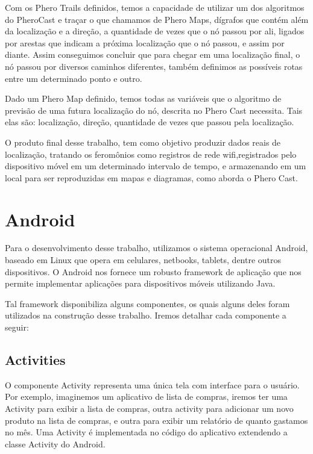\documentclass[12pt, %
openright, 
oneside,
a4paper,
brazil]{facom-ufu-abntex2}
\begin{document}
	Com os Phero Trails definidos, temos a capacidade de utilizar um dos algoritmos do PheroCast e traçar o que chamamos de Phero Maps, dígrafos que contém além da localização e a direção, a quantidade de vezes que o nó passou por ali, ligados por arestas que indicam a próxima localização que o nó passou, e assim por diante. Assim conseguimos concluir que para chegar em uma localização final, o nó passou por diversos caminhos diferentes, também definimos as possíveis rotas entre um determinado ponto e outro.
	
	Dado um Phero Map definido, temos todas as variáveis que o algoritmo de previsão de uma futura localização do nó, descrita no Phero Cast necessita. Tais elas são: localização, direção, quantidade de vezes que passou pela localização. 
	
 	O produto final desse trabalho, tem como objetivo produzir dados reais de localização, tratando os feromônios como registros de rede wifi,registrados pelo dispositivo móvel em um determinado intervalo de tempo, e armazenando em um local para ser reproduzidas em mapas e diagramas, como aborda o Phero Cast.
	

\section{Android}

	Para o desenvolvimento desse trabalho, utilizamos o sistema operacional Android, baseado em Linux que opera em celulares, netbooks, tablets, dentre outros dispositivos. O Android nos fornece um robusto framework de aplicação que nos permite implementar aplicações para dispositivos móveis utilizando Java.
	

	Tal framework disponibiliza alguns componentes, os quais alguns deles foram utilizados na construção desse trabalho.
	Iremos detalhar cada componente a seguir:
	\cite{googleand}
	
	\subsection{Activities}
	O componente Activity representa uma única tela com interface para o usuário. Por exemplo, imaginemos um aplicativo de lista de compras, iremos ter uma Activity para exibir a lista de compras, outra activity para adicionar um novo produto na lista de compras, e outra para exibir um relatório de quanto gastamos no mês.
	Uma Activity é implementada no código do aplicativo extendendo a classe Activity do Android.
	
\end{document}
